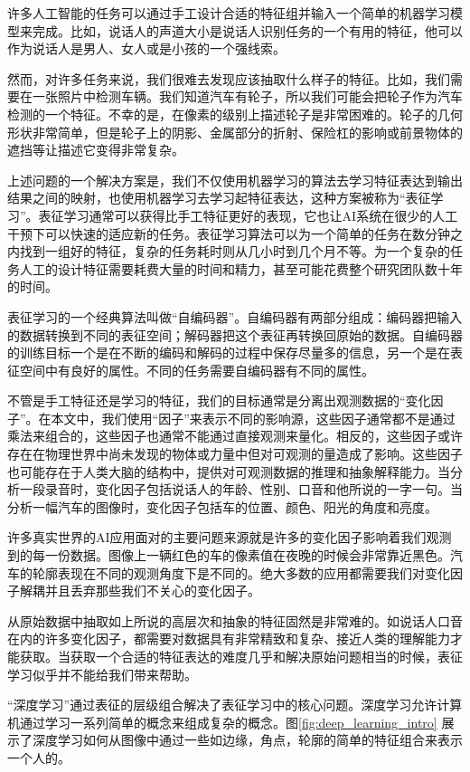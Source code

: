 \documentclass[a4paper,11pt]{book}
\begin{document}
许多人工智能的任务可以通过手工设计合适的特征组并输入一个简单的机器学习模型来完成。比如，说话人的声道大小是说话人识别任务的一个有用的特征，他可以作为说话人是男人、女人或是小孩的一个强线索。


然而，对许多任务来说，我们很难去发现应该抽取什么样子的特征。比如，我们需要在一张照片中检测车辆。我们知道汽车有轮子，所以我们可能会把轮子作为汽车检测的一个特征。不幸的是，在像素的级别上描述轮子是非常困难的。轮子的几何形状非常简单，但是轮子上的阴影、金属部分的折射、保险杠的影响或前景物体的遮挡等让描述它变得非常复杂。


上述问题的一个解决方案是，我们不仅使用机器学习的算法去学习特征表达到输出结果之间的映射，也使用机器学习去学习起特征表达，这种方案被称为“表征学习”。表征学习通常可以获得比手工特征更好的表现，它也让AI系统在很少的人工干预下可以快速的适应新的任务。表征学习算法可以为一个简单的任务在数分钟之内找到一组好的特征，复杂的任务耗时则从几小时到几个月不等。为一个复杂的任务人工的设计特征需要耗费大量的时间和精力，甚至可能花费整个研究团队数十年的时间。


表征学习的一个经典算法叫做“自编码器”。自编码器有两部分组成：编码器把输入的数据转换到不同的表征空间；解码器把这个表征再转换回原始的数据。自编码器的训练目标一个是在不断的编码和解码的过程中保存尽量多的信息，另一个是在表征空间中有良好的属性。不同的任务需要自编码器有不同的属性。


不管是手工特征还是学习的特征，我们的目标通常是分离出观测数据的“变化因子”。在本文中，我们使用“因子”来表示不同的影响源，这些因子通常都不是通过乘法来组合的，这些因子也通常不能通过直接观测来量化。相反的，这些因子或许存在在物理世界中尚未发现的物体或力量中但对可观测的量造成了影响。这些因子也可能存在于人类大脑的结构中，提供对可观测数据的推理和抽象解释能力。当分析一段录音时，变化因子包括说话人的年龄、性别、口音和他所说的一字一句。当分析一幅汽车的图像时，变化因子包括车的位置、颜色、阳光的角度和亮度。


许多真实世界的AI应用面对的主要问题来源就是许多的变化因子影响着我们观测到的每一份数据。图像上一辆红色的车的像素值在夜晚的时候会非常靠近黑色。汽车的轮廓表现在不同的观测角度下是不同的。绝大多数的应用都需要我们对变化因子解耦并且丢弃那些我们不关心的变化因子。


从原始数据中抽取如上所说的高层次和抽象的特征固然是非常难的。如说话人口音在内的许多变化因子，都需要对数据具有非常精致和复杂、接近人类的理解能力才能获取。当获取一个合适的特征表达的难度几乎和解决原始问题相当的时候，表征学习似乎并不能给我们带来帮助。


“深度学习”通过表征的层级组合解决了表征学习中的核心问题。深度学习允许计算机通过学习一系列简单的概念来组成复杂的概念。图\ref{fig:deep_learning_intro} 展示了深度学习如何从图像中通过一些如边缘，角点，轮廓的简单的特征组合来表示一个人的。
\end{document}
